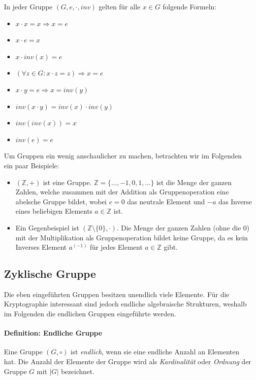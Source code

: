 In jeder Gruppe $(G,e,\cdot,inv)$ gelten für alle $x \in G$ folgende Formeln:
\begin{itemize}
\item $x \cdot x = x \Rightarrow x = e$
\item $x \cdot e = x$
\item $x \cdot inv(x) = e$
\item $(\forall z \in G: x \cdot z = z) \Rightarrow x = e$
\item $x \cdot y = e \Rightarrow x = inv(y)$
\item $inv(x \cdot y) = inv(x) \cdot inv(y)$
\item $inv(inv(x)) = x$
\item $inv(e) = e$
\end{itemize}

Um Gruppen ein wenig anschaulicher zu machen, betrachten wir im Folgenden ein paar Beispiele:
\begin{itemize}
\item $(\mathbb{Z}, +)$ ist eine Gruppe. $\mathbb{Z} = \{\dots, -1, 0, 1, \dots \}$ ist die Menge der ganzen Zahlen, welche zusammen mit der Addition als Gruppenoperation eine abelsche Gruppe bildet, wobei $e = 0$ das neutrale Element und $-a$ das Inverse eines beliebigen Elements $a \in \mathbb{Z}$ ist.
\item Ein Gegenbeispiel ist $(\mathbb{Z} \setminus \{0\}, \cdot)$. Die Menge der ganzen Zahlen (ohne die 0) mit der Multiplikation als Gruppenoperation bildet keine Gruppe, da es kein Inverses Element $a^(-1)$ für jedes Element $a \in \mathbb{Z}$ gibt.
\end{itemize}
\subsection{Zyklische Gruppe}
Die eben eingeführten Gruppen besitzen unendlich viele Elemente. Für die Kryptographie interessant sind jedoch endliche algebraische Strukturen, weshalb im Folgenden die endlichen Gruppen eingeführte werden.

\paragraph{Definition: Endliche Gruppe}
Eine Gruppe $(G, \circ)$ ist \textit{endlich}, wenn sie eine endliche Anzahl an Elementen hat. Die Anzahl der Elemente der Gruppe wird als 
\textit{Kardinalität} oder \textit{Ordnung} der Gruppe $G$ mit $|G|$ bezeichnet.

